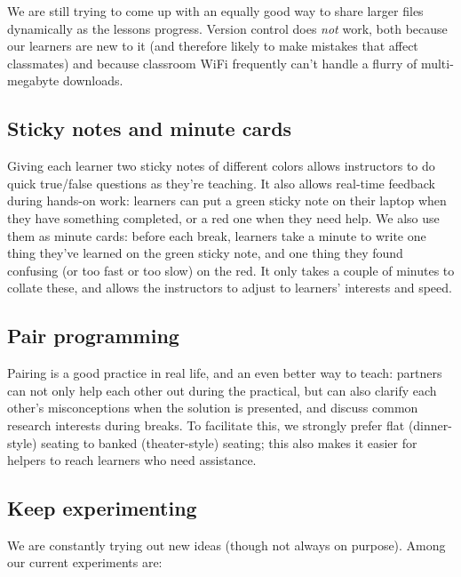 \documentclass[10pt,a4paper,twocolumn]{article}
\begin{document}
We are still trying to come up with an equally good way to share
larger files dynamically as the lessons progress.  Version control
does \emph{not} work, both because our learners are new to it (and
therefore likely to make mistakes that affect classmates) and because
classroom WiFi frequently can't handle a flurry of multi-megabyte
downloads.

\subsection*{Sticky notes and minute cards}

Giving each learner two sticky notes of different colors allows
instructors to do quick true/false questions as they're teaching. It
also allows real-time feedback during hands-on work: learners can put
a green sticky note on their laptop when they have something
completed, or a red one when they need help. We also use them as
minute cards: before each break, learners take a minute to write one
thing they've learned on the green sticky note, and one thing they
found confusing (or too fast or too slow) on the red. It only takes a
couple of minutes to collate these, and allows the instructors to
adjust to learners' interests and speed.

\subsection*{Pair programming}

Pairing is a good practice in real life, and an even better way to
teach: partners can not only help each other out during the practical,
but can also clarify each other's misconceptions when the solution is
presented, and discuss common research interests during breaks. To
facilitate this, we strongly prefer flat (dinner-style) seating to
banked (theater-style) seating; this also makes it easier for helpers
to reach learners who need assistance.

\subsection*{Keep experimenting}

We are constantly trying out new ideas (though not always on purpose).
Among our current experiments are:
\end{document}

